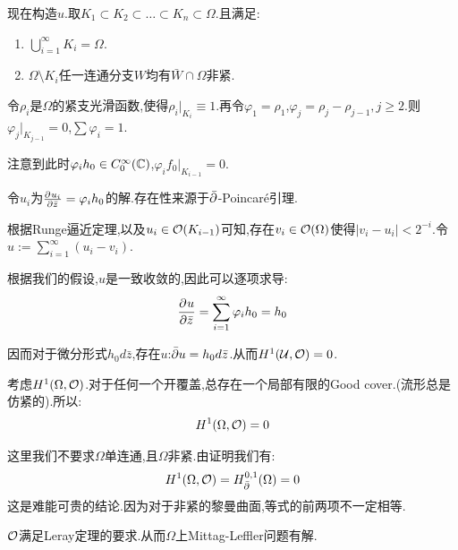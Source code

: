现在构造$u$.取$K_1\subset K_2 \subset \dots \subset K_n\subset \Omega$.且满足:
\begin{enumerate}
	\item $\bigcup_{i=1}^\infty K_i =\Omega$.
	\item $\Omega\setminus K_i$任一连通分支$W$均有$\bar{W}\cap \Omega$非紧.
\end{enumerate}

令$\rho_i$是$\Omega$的紧支光滑函数,使得$\rho_i|_{K_i}\equiv 1$.再令$\varphi_1=\rho_1$,$\varphi_j=\rho_j-\rho_{j-1},j\geq 2$.则$\varphi_j|_{K_{j-1}}=0$,$\sum \varphi_i=1$.

注意到此时$\varphi_i h_0 \in C_0^\infty(\mathbb{C})$,$\varphi_i f_0|_{K_{i-1}}=0$.

令$u_i$为$\frac{\partial^{} u_i}{\partial {\bar{z}}^{}}=\varphi_i h_0$的解.存在性来源于$\bar{\partial}$-Poincar\'{e}引理.

根据Runge逼近定理,以及$u_i \in \mathcal{O}(K_{i-1})$可知,存在$v_i \in \mathcal{O}(\Omega)$使得$|v_i-u_i|<2^{-i}$.令$u:=\displaystyle\sum_{i=1}^\infty (u_i-v_i)$.

根据我们的假设,$u$是一致收敛的,因此可以逐项求导:
\begin{align*}
	\frac{\partial^{} u}{\partial {\bar{z}}^{}}=\sum_{i=1}^\infty \varphi_i h_0=h_0
\end{align*}

因而对于微分形式$h_0d\bar{z}$,存在$u$:$\bar{\partial} u=h_0 d\bar{z}$.从而$H^1(\mathcal{U},\mathcal{O})=0$.

考虑$H^1(\Omega,\mathcal{O})$.对于任何一个开覆盖,总存在一个局部有限的Good cover.(流形总是仿紧的).所以:
\begin{align*}
	H^1(\Omega,\mathcal{O})=0
\end{align*}

这里我们不要求$\Omega$单连通,且$\Omega$非紧.由证明我们有:
\begin{align*}
	H^1(\Omega,\mathcal{O})=H^{0,1}_{\bar{\partial}}(\Omega)=0
\end{align*}
这是难能可贵的结论.因为对于非紧的黎曼曲面,等式的前两项不一定相等.

\begin{corollary}
	$\mathcal{O}$满足Leray定理的要求.从而$\Omega$上Mittag-Leffler问题有解.
\end{corollary}

